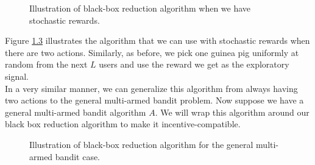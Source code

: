 \documentclass[
  letterpaper,
  numbers=noenddot,
  DIV=11,
  oneside]{scrreprt}
\theoremstyle{remark}
\begin{document}
\begin{figure}


\caption{\label{fig-stochastic-guinea-pig}Illustration of black-box
reduction algorithm when we have stochastic rewards.}

\end{figure}%

Figure \hyperref[fig-stochastic-guinea-pig]{1.3} illustrates the
algorithm that we can use with stochastic rewards when there are two
actions. Similarly, as before, we pick one guinea pig uniformly at
random from the next \(L\) users and use the reward we get as the
exploratory signal.\\
In a very similar manner, we can generalize this algorithm from always
having two actions to the general multi-armed bandit problem. Now
suppose we have a general multi-armed bandit algorithm \(A\). We will
wrap this algorithm around our black box reduction algorithm to make it
incentive-compatible.

\begin{figure}


\caption{\label{fig-multi-armed-guinea-pig}Illustration of black-box
reduction algorithm for the general multi-armed bandit case.}

\end{figure}%
\end{document}
